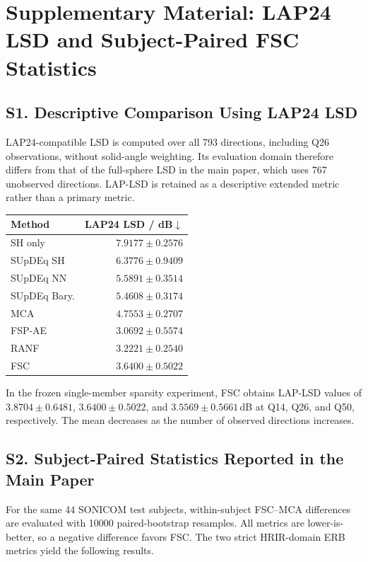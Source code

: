 \documentclass[UTF8,a4paper]{article}
\begin{document}
\section*{Supplementary Material: LAP24 LSD and Subject-Paired FSC Statistics}

\subsection*{S1. Descriptive Comparison Using LAP24 LSD}

LAP24-compatible LSD is computed over all 793 directions, including Q26 observations, without solid-angle weighting. Its evaluation domain therefore differs from that of the full-sphere LSD in the main paper, which uses 767 unobserved directions. LAP-LSD is retained as a descriptive extended metric rather than a primary metric.

\begin{table}[htbp]
\centering\small
\begin{tabular}{lr}
\toprule
Method & LAP24 LSD / dB$\downarrow$ \\
\midrule
SH only & $7.9177 \pm 0.2576$ \\
SUpDEq SH & $6.3776 \pm 0.9409$ \\
SUpDEq NN & $5.5891 \pm 0.3514$ \\
SUpDEq Bary. & $5.4608 \pm 0.3174$ \\
MCA & $4.7553 \pm 0.2707$ \\
FSP-AE & $\mathbf{3.0692} \pm 0.5574$ \\
RANF & $3.2221 \pm 0.2540$ \\
FSC & $3.6400 \pm 0.5022$ \\
\bottomrule
\end{tabular}
\end{table}

In the frozen single-member sparsity experiment, FSC obtains LAP-LSD values of $3.8704\pm0.6481$, $3.6400\pm0.5022$, and $3.5569\pm0.5661$\,dB at Q14, Q26, and Q50, respectively. The mean decreases as the number of observed directions increases.

\subsection*{S2. Subject-Paired Statistics Reported in the Main Paper}

For the same 44 SONICOM test subjects, within-subject FSC--MCA differences are evaluated with 10000 paired-bootstrap resamples. All metrics are lower-is-better, so a negative difference favors FSC. The two strict HRIR-domain ERB metrics yield the following results.
\end{document}
